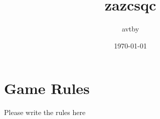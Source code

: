 \documentclass{article}%
\title{zazcsqc}%
\author{avtby}%
\date{\today}%
\begin{document}
%
\normalsize%
\maketitle%
\section{Game Rules}%
\label{sec:GameRules}%
Please write the rules here

%
\end{document}
